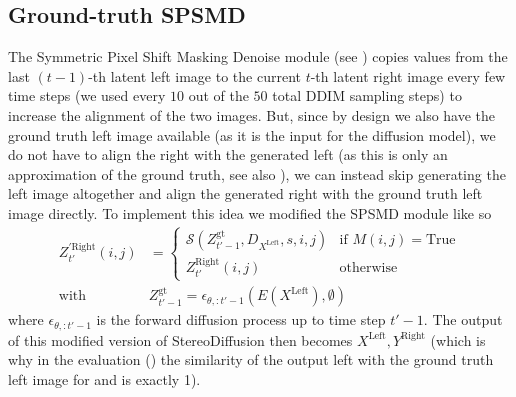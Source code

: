 \subsection{Ground-truth SPSMD}\label{gt-alignment}
The Symmetric Pixel Shift Masking Denoise module (see ) copies values from the last $(t-1)$-th latent left image to the current $t$-th latent right image every few time steps (we used every $10$ out of the $50$ total DDIM sampling steps) to increase the alignment of the two images. But, since by design we also have the ground truth left image available (as it is the input for the diffusion model), we do not have to align the right with the generated left (as this is only an approximation of the ground truth, see also \cite{mokady2023null}), we can instead skip generating the left image altogether and align the generated right with the ground truth left image directly. To implement this idea we modified the SPSMD module like so
\begin{align}\label{eq:gt-align}
    Z_{t'}^{'\text{Right}}(i,j) &= 
    \begin{cases}
        \mathcal{S}(Z_{t'-1}^\text{gt},D_{X^\text{Left}},s,i,j) &\text{if }M(i,j)=\text{True}\\
        Z_{t'}^\text{Right}(i,j) &\text{otherwise}
    \end{cases}\\
        \text{with }&Z_{t'-1}^\text{gt} = \epsilon_{\theta,:t'-1}(E(X^\text{Left}),\emptyset)
\end{align}
where $\epsilon_{\theta,:t'-1}$ is the forward diffusion process up to time step $t'-1$. The output of this modified version of StereoDiffusion then becomes $X^\text{Left},Y^\text{Right}$ (which is why in the evaluation () the similarity of the output left with the ground truth left image for  and  is exactly 1).


